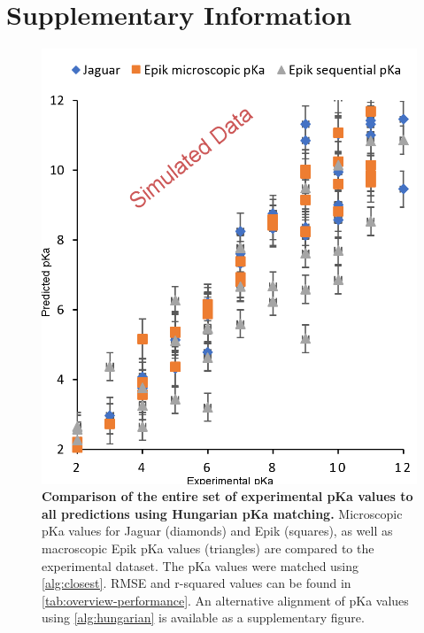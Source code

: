 \documentclass[9pt,lineno,final]{elife}
\begin{document}
\nocite{*} %




\appendix

\section{Supplementary Information}


\begin{figure}[H]
\centering
\includegraphics[width=0.8\linewidth]{pKa-comparison-simulated.png}
\caption{{\bf Comparison of the entire set of experimental pKa values to all predictions using Hungarian pKa matching.} Microscopic pKa values for Jaguar (diamonds) and Epik (squares), as well as macroscopic Epik pKa values (triangles) are compared to the experimental dataset. The pKa values were matched using \cref{alg:closest}. RMSE and r-squared values can be found in \cref{tab:overview-performance}. An alternative alignment of pKa values using \cref{alg:hungarian} is available as a supplementary figure. \label{correlation-hungarian}}

\end{figure}
\end{document}
